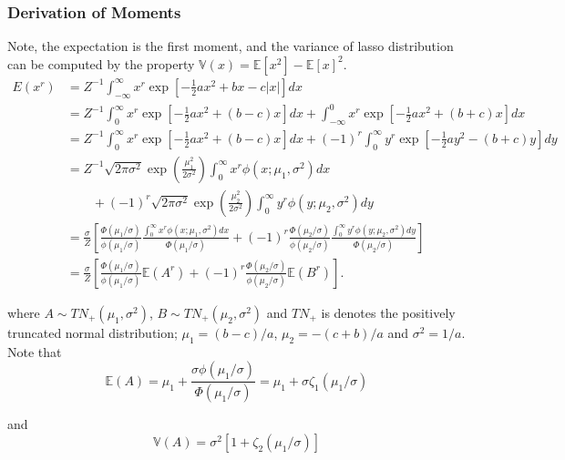 \subsubsection{Derivation of Moments}
Note, the expectation is the first moment, and the variance of lasso distribution can be computed by the property $\mathbb{V}(x) = \mathbb{E}[x^2]- \mathbb{E}[x]^2$.
$$
\begin{array}{rl}
		E(x^r)
		&  = Z^{-1} \int_{-\infty}^\infty x^r \exp\left[ -\tfrac{1}{2}ax^2 + bx - c|x| \right] dx
		\\ [2ex]
		& 
		= Z^{-1}  \int_0^\infty   x^r \exp\left[ -\tfrac{1}{2}ax^2 + (b - c)x \right] dx
		+ \int_{-\infty}^0 x^r \exp\left[ -\tfrac{1}{2}ax^2 + (b + c)x \right] dx
		\\ [2ex]
		& 
		=  Z^{-1}  \int_0^\infty x^r \exp\left[ -\tfrac{1}{2}ax^2 + (b - c)x \right] dx
		+ (-1)^r\int_0^\infty y^r \exp\left[ -\tfrac{1}{2}ay^2 - (b + c)y \right] dy
		\\ [2ex]
		& 
		= Z^{-1}  \sqrt{2\pi\sigma^2}
		\exp\left(  \frac{\mu_1^2}{2\sigma^2} \right) \int_0^\infty x^r \phi(x;\mu_1,\sigma^2) dx
		\\ [2ex]
		&  \qquad + (-1)^r    \sqrt{2\pi\sigma^2}   \exp\left(  \frac{\mu_2^2}{2\sigma^2} \right) \int_0^\infty y^r \phi(y;\mu_2,\sigma^2) dy
		
		\\ [2ex]
		& 
		= \frac{\sigma}{Z} \left[  
		\frac{\Phi(\mu_1/\sigma)}{\phi(\mu_1/\sigma)} \frac{\int_0^\infty x^r \phi(x;\mu_1,\sigma^2) dx}{\Phi(\mu_1/\sigma)}
		+ (-1)^r  \frac{\Phi(\mu_2/\sigma)}{\phi(\mu_2/\sigma)}  \frac{\int_0^\infty y^r \phi(y;\mu_2,\sigma^2) dy}{\Phi(\mu_2/\sigma)}
		\right] 
		
		\\ [4ex]
		& 
		= \frac{\sigma}{Z} \left[  
		\frac{\Phi(\mu_1/\sigma)}{\phi(\mu_1/\sigma)} 
		\mathbb{E}( A^r )
		+ (-1)^r  \frac{\Phi(\mu_2/\sigma)}{\phi(\mu_2/\sigma)}  \mathbb{E}( B^r )
		\right].
\end{array} 
$$




\noindent where $A\sim TN_+(\mu_1,\sigma^2)$, $B\sim TN_+(\mu_2,\sigma^2)$ and $TN_+$ is denotes the positively truncated normal distribution; $\mu_1 = (b-c)/a$, $\mu_2 = -(c + b)/a$ and $\sigma^2 = 1/a$.
Note that
$$
\mathbb{E}(A) = \mu_1 + \frac{\sigma \phi(\mu_1/\sigma)}{\Phi(\mu_1/\sigma)} = \mu_1 + \sigma \zeta_1(\mu_1/\sigma)
$$

\noindent and
$$
\mathbb{V}(A) = \sigma^2  \left[ 1 + \zeta_2(\mu_1/\sigma) \right] 
$$

